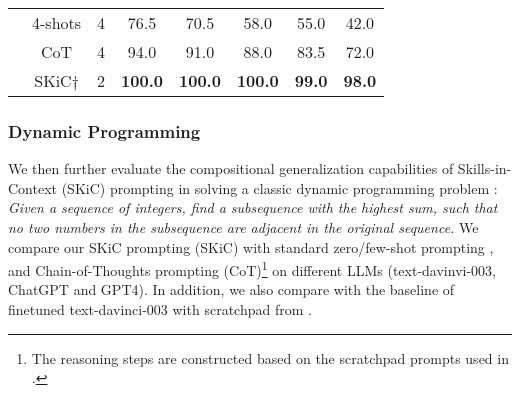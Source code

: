 \begin{table}[t]
\begin{tabular}{c|c|c|cc|ccc}
                          & 4-shots     &4       & 76.5                             & 70.5          & 58.0          & 55.0          & 42.0          \\
                          & CoT       &4         & 94.0                             & 91.0         & 88.0          & 83.5          & 72.0          \\
                          & SKiC$\dag$  &2             & \textbf{100.0}                    & \textbf{100.0} & \textbf{100.0} & \textbf{99.0} & \textbf{98.0} \\ \bottomrule
\end{tabular} 
\end{table}




\subsubsection{Dynamic Programming}
We then further evaluate the compositional generalization capabilities of Skills-in-Context (SKiC) prompting in solving a classic dynamic programming problem \citep{dziri2023faith}: \textit{Given a sequence of integers, find a subsequence with the highest sum, such that no two numbers in the subsequence are adjacent in the original sequence.} We compare our SKiC prompting (SKiC) with standard zero/few-shot prompting \citep{brown2020language}, and Chain-of-Thoughts prompting (CoT)\footnote{The reasoning steps are constructed based on the scratchpad prompts used in \citet{dziri2023faith}.}  \citep{wei2022chain} on different LLMs (text-davinvi-003, ChatGPT and GPT4). In addition, we also compare with the baseline of finetuned text-davinci-003 with scratchpad from \citep{dziri2023faith}.
